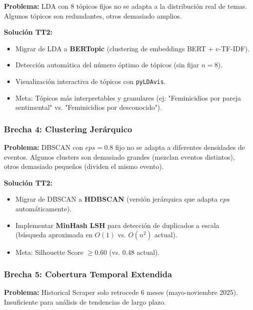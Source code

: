 \textbf{Problema:} LDA con 8 tópicos fijos no se adapta a la distribución real de temas. Algunos tópicos son redundantes, otros demasiado amplios.

\textbf{Solución TT2:}
\begin{itemize}
    \item Migrar de LDA a \textbf{BERTopic} (clustering de embeddings BERT + c-TF-IDF).
    \item Detección automática del número óptimo de tópicos (sin fijar $n=8$).
    \item Visualización interactiva de tópicos con \texttt{pyLDAvis}.
    \item Meta: Tópicos más interpretables y granulares (ej: "Feminicidios por pareja sentimental" vs. "Feminicidios por desconocido").
\end{itemize}

\subsubsection{Brecha 4: Clustering Jerárquico}

\textbf{Problema:} DBSCAN con $eps=0.8$ fijo no se adapta a diferentes densidades de eventos. Algunos clusters son demasiado grandes (mezclan eventos distintos), otros demasiado pequeños (dividen el mismo evento).

\textbf{Solución TT2:}
\begin{itemize}
    \item Migrar de DBSCAN a \textbf{HDBSCAN} (versión jerárquica que adapta $eps$ automáticamente).
    \item Implementar \textbf{MinHash LSH} para detección de duplicados a escala (búsqueda aproximada en $O(1)$ vs. $O(n^2)$ actual).
    \item Meta: Silhouette Score $\geq 0.60$ (vs. 0.48 actual).
\end{itemize}

\subsubsection{Brecha 5: Cobertura Temporal Extendida}

\textbf{Problema:} Historical Scraper solo retrocede 6 meses (mayo-noviembre 2025). Insuficiente para análisis de tendencias de largo plazo.

